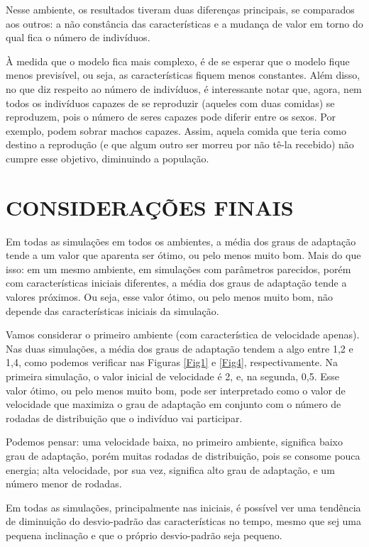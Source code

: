 \documentclass[10pt,brazil,english]{article}
\begin{document}
            Nesse ambiente, os resultados tiveram duas diferenças principais, se comparados aos outros: a não constância das características e a mudança de valor em torno do qual fica o número de indivíduos.
            
            À medida que o modelo fica mais complexo, é de se esperar que o modelo fique menos previsível, ou seja, as características fiquem menos constantes. Além disso, no que diz respeito ao número de indivíduos, é interessante notar que, agora, nem todos os indivíduos capazes de se reproduzir (aqueles com duas comidas) se reproduzem, pois o número de seres capazes pode diferir entre os sexos. Por exemplo, podem sobrar machos capazes. Assim, aquela comida que teria como destino a reprodução (e que algum outro ser morreu por não tê-la recebido) não cumpre esse objetivo, diminuindo a população.
    
    \section{\uppercase{Considerações Finais}} 
    
        Em todas as simulações em todos os ambientes, a média dos graus de adaptação tende a um valor que aparenta ser ótimo, ou pelo menos muito bom. Mais do que isso: em um mesmo ambiente, em simulações com parâmetros parecidos, porém com características iniciais diferentes, a média dos graus de adaptação tende a valores próximos. Ou seja, esse valor ótimo, ou pelo menos muito bom, não depende das características iniciais da simulação.
        
        Vamos considerar o primeiro ambiente (com característica de velocidade apenas). Nas duas simulações, a média dos graus de adaptação tendem a algo entre 1,2 e 1,4, como podemos verificar nas Figuras \ref{Fig1} e \ref{Fig4}, respectivamente. Na primeira simulação, o valor inicial de velocidade é 2, e, na segunda, 0,5. Esse valor ótimo, ou pelo menos muito bom, pode ser interpretado como o valor de velocidade que maximiza o grau de adaptação em conjunto com o número de rodadas de distribuição que o indivíduo vai participar.
        
        Podemos pensar: uma velocidade baixa, no primeiro ambiente, significa baixo grau de adaptação, porém muitas rodadas de distribuição, pois se consome pouca energia; alta velocidade, por sua vez, significa alto grau de adaptação, e um número menor de rodadas.
        
        Em todas as simulações, principalmente nas iniciais, é possível ver uma tendência de diminuição do desvio-padrão das características no tempo, mesmo que sej uma pequena inclinação e que o próprio desvio-padrão seja pequeno.
    
\end{document}
